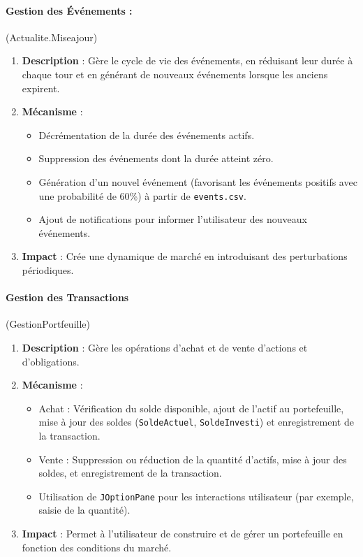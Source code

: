 \paragraph{Gestion des Événements :}(Actualite.Miseajour) 
\begin{enumerate}
    \item \textbf{Description} : Gère le cycle de vie des événements, en réduisant leur durée à chaque tour et en générant de nouveaux événements lorsque les anciens expirent.

    \item \textbf{Mécanisme} :
    \begin{itemize}
        \item Décrémentation de la durée des événements actifs.
        \item Suppression des événements dont la durée atteint zéro.
        \item Génération d'un nouvel événement (favorisant les événements positifs avec une probabilité de 60\%) à partir de \texttt{events.csv}.
        \item Ajout de notifications pour informer l'utilisateur des nouveaux événements.
    \end{itemize}
    
    \item \textbf{Impact} : Crée une dynamique de marché en introduisant des perturbations périodiques.
\end{enumerate}

\vspace{0.5cm}

\paragraph{Gestion des Transactions} (GestionPortfeuille)

\begin{enumerate}
    \item \textbf{Description} : Gère les opérations d'achat et de vente d'actions et d'obligations.
    
    \item \textbf{Mécanisme} :
    \begin{itemize}
        \item Achat : Vérification du solde disponible, ajout de l'actif au portefeuille, mise à jour des soldes (\texttt{SoldeActuel}, \texttt{SoldeInvesti}) et enregistrement de la transaction.
        \item Vente : Suppression ou réduction de la quantité d'actifs, mise à jour des soldes, et enregistrement de la transaction.
        \item Utilisation de \texttt{JOptionPane} pour les interactions utilisateur (par exemple, saisie de la quantité).
    \end{itemize}
    
    \item \textbf{Impact} : Permet à l'utilisateur de construire et de gérer un portefeuille en fonction des conditions du marché.
\end{enumerate}

